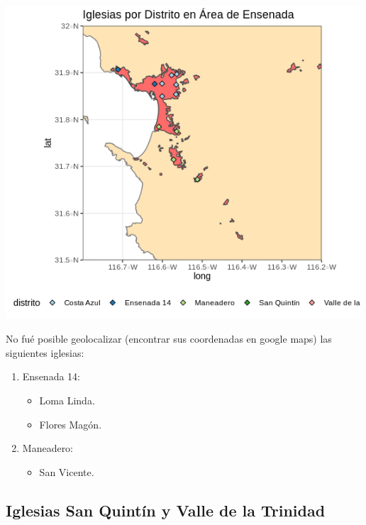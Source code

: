 \documentclass[]{article}
\providecommand{\tightlist}{%
  \setlength{\itemsep}{0pt}\setlength{\parskip}{0pt}}
\begin{document}
\includegraphics[width=5.20833in]{img/iglesiasEnsenada.png}

No fué posible geolocalizar (encontrar sus coordenadas en google maps)
las siguientes iglesias:

\begin{enumerate}
\def\labelenumi{\arabic{enumi}.}
\tightlist
\item
  Ensenada 14:

  \begin{itemize}
  \tightlist
  \item
    Loma Linda.
  \item
    Flores Magón.
  \end{itemize}
\item
  Maneadero:

  \begin{itemize}
  \tightlist
  \item
    San Vicente.
  \end{itemize}
\end{enumerate}

\subsection{Iglesias San Quintín y Valle de la
Trinidad}\label{iglesias-san-quintuxedn-y-valle-de-la-trinidad}
\end{document}
